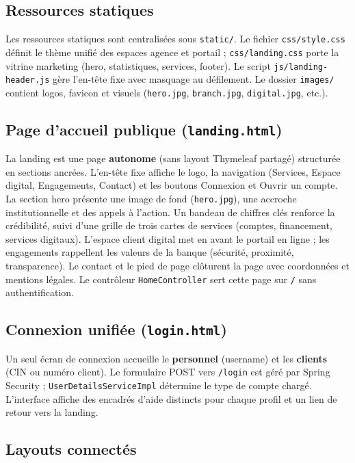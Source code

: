 \documentclass[11pt,a4paper,oneside]{report}
\begin{document}
\subsection{Ressources statiques}

Les ressources statiques sont centralisées sous \texttt{static/}. Le fichier \texttt{css/style.css} définit le thème unifié des espaces agence et portail ; \texttt{css/landing.css} porte la vitrine marketing (hero, statistiques, services, footer). Le script \texttt{js/landing-header.js} gère l'en-tête fixe avec masquage au défilement. Le dossier \texttt{images/} contient logos, favicon et visuels (\texttt{hero.jpg}, \texttt{branch.jpg}, \texttt{digital.jpg}, etc.).

\subsection{Page d'accueil publique (\texttt{landing.html})}

La landing est une page \textbf{autonome} (sans layout Thymeleaf partagé) structurée en sections ancrées. L'en-tête fixe affiche le logo, la navigation (Services, Espace digital, Engagements, Contact) et les boutons Connexion et Ouvrir un compte. La section hero présente une image de fond (\texttt{hero.jpg}), une accroche institutionnelle et des appels à l'action. Un bandeau de chiffres clés renforce la crédibilité, suivi d'une grille de trois cartes de services (comptes, financement, services digitaux). L'espace client digital met en avant le portail en ligne ; les engagements rappellent les valeurs de la banque (sécurité, proximité, transparence). Le contact et le pied de page clôturent la page avec coordonnées et mentions légales. Le contrôleur \texttt{HomeController} sert cette page sur \texttt{/} sans authentification.

\subsection{Connexion unifiée (\texttt{login.html})}

Un seul écran de connexion accueille le \textbf{personnel} (username) et les \textbf{clients} (CIN ou numéro client). Le formulaire POST vers \texttt{/login} est géré par Spring Security ; \texttt{UserDetailsServiceImpl} détermine le type de compte chargé. L'interface affiche des encadrés d'aide distincts pour chaque profil et un lien de retour vers la landing.

\subsection{Layouts connectés}
\end{document}
